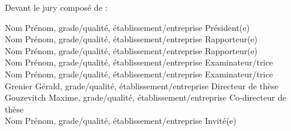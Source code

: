 	{\fontsize{12pt}{14pt}\selectfont
	Devant le jury composé de :\\}
	{\fontsize{11pt}{13pt}\selectfont

	Nom Prénom, grade/qualité, établissement/entreprise \hfill Président(e)\\ %

	Nom Prénom, grade/qualité, établissement/entreprise \hfill Rapporteur(e)\\
	Nom Prénom, grade/qualité, établissement/entreprise \hfill Rapporteur(e)\\
	Nom Prénom, grade/qualité, établissement/entreprise \hfill Examinateur/trice\\
	Nom Prénom, grade/qualité, établissement/entreprise \hfill Examinateur/trice\\
	
	Grenier Gérald, grade/qualité, établissement/entreprise \hfill Directeur de thèse\\
	Gouzevitch Maxime, grade/qualité, établissement/entreprise \hfill Co-directeur de thèse\\
	Nom Prénom, grade/qualité, établissement/entreprise \hfill Invité(e)} %
	\cleardoublepage
	\restoregeometry